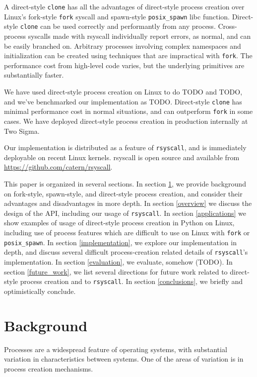 \documentclass[sigplan]{acmart}
\begin{document}
A direct-style \texttt{clone} has all the advantages of direct-style process creation
over Linux's fork-style \texttt{fork} syscall and spawn-style \texttt{posix\_spawn} libc function.
Direct-style \texttt{clone} can be used correctly and performantly from any process.
Cross-process syscalls made with rsyscall individually report errors, as normal, and can be easily branched on.
Arbitrary processes involving complex namespaces and initialization can be created
using techniques that are impractical with \texttt{fork}.
The performance cost from high-level code varies, but the underlying primitives are substantially faster.

We have used direct-style process creation on Linux to do TODO and TODO,
and we've benchmarked our implementation as TODO.
Direct-style \texttt{clone} has minimal performance cost in normal situations,
and can outperform \texttt{fork} in some cases.
We have deployed direct-style process creation in production internally at Two Sigma.

Our implementation is distributed as a feature of \texttt{rsyscall},
and is immediately deployable on recent Linux kernels.
rsyscall is open source and available from \url{https://github.com/catern/rsyscall}.

This paper is organized in several sections.
In section \ref{background}, we provide background on fork-style, spawn-style, and direct-style process creation,
and consider their advantages and disadvantages in more depth.
In section \ref{overview} we discuss the design of the API,
including our usage of \texttt{rsyscall}.
In section \ref{applications} we show examples of usage of direct-style process creation in Python on Linux,
including use of process features which are difficult to use on Linux with \texttt{fork} or \texttt{posix\_spawn}.
In section \ref{implementation}, we explore our implementation in depth,
and discuss several difficult process-creation related details of \texttt{rsyscall}'s implementation.
In section \ref{evaluation}, we evaluate, somehow (TODO).
In section \ref{future_work},
we list several directions for future work related to direct-style process creation and to \texttt{rsyscall}.
In section \ref{conclusions}, we briefly and optimistically conclude.

\section{Background}\label{background}
Processes are a widespread feature of operating systems,
with substantial variation in characteristics between systems.
One of the areas of variation is in process creation mechanisms.
\end{document}
